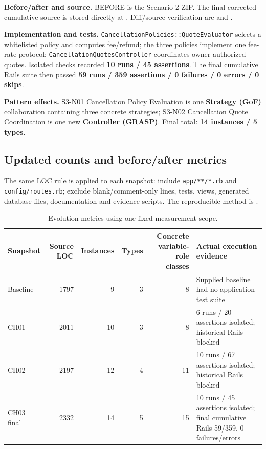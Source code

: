 \documentclass[11pt,a4paper]{article}
\renewcommand{\_}{\textunderscore\allowbreak}
\begin{document}
\textbf{Before/after and source.} BEFORE is the Scenario 2 ZIP. The final corrected cumulative source is stored directly at . Diff/source verification are  and .

\textbf{Implementation and tests.} \texttt{CancellationPolicies::QuoteEvaluator} selects a whitelisted policy and computes fee/refund; the three policies implement one fee-rate protocol; \texttt{CancellationQuotesController} coordinates owner-authorized quotes. Isolated checks recorded \textbf{10 runs / 45 assertions}. The final cumulative Rails suite then passed \textbf{59 runs / 359 assertions / 0 failures / 0 errors / 0 skips}.

\textbf{Pattern effects.} S3-N01 Cancellation Policy Evaluation is one \textbf{Strategy (GoF)} collaboration containing three concrete strategies; S3-N02 Cancellation Quote Coordination is one new \textbf{Controller (GRASP)}. Final total: \textbf{14 instances / 5 types}.

\subsection{Updated counts and before/after metrics}
The same LOC rule is applied to each snapshot: include \texttt{app/**/*.rb} and \texttt{config/routes.rb}; exclude blank/comment-only lines, tests, views, generated database files, documentation and evidence scripts. The reproducible method is .

\begin{table}[H]\centering\small
\begin{tabularx}{\linewidth}{lrrrrX}
\toprule
Snapshot & Source LOC & Instances & Types & Concrete variable-role classes & Actual execution evidence\\\midrule
Baseline & 1797 & 9 & 3 & 8 & Supplied baseline had no application test suite\\
CH01 & 2011 & 10 & 3 & 8 & 6 runs / 20 assertions isolated; historical Rails blocked\\
CH02 & 2197 & 12 & 4 & 11 & 10 runs / 67 assertions isolated; historical Rails blocked\\
CH03 final & 2332 & 14 & 5 & 15 & 10 runs / 45 assertions isolated; final cumulative Rails 59/359, 0 failures/errors\\
\bottomrule
\end{tabularx}
\caption{Evolution metrics using one fixed measurement scope.}
\end{table}
\end{document}
